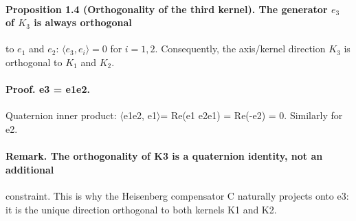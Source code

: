 \paragraph*{Proposition 1.4 (Orthogonality of the third kernel). The generator $e_3$ of $K_3$ is always orthogonal}
to $e_1$ and $e_2$: $\langle e_3, e_i\rangle = 0$ for $i=1,2$. Consequently, the axis/kernel direction $K_3$ is orthogonal to $K_1$ and $K_2$.
\paragraph*{Proof. e3 = e1e2.}
Quaternion inner product: $\langle$e1e2, e1$\rangle$= Re(e1 e2e1) = Re(-e2) = 0. Similarly for e2.
\paragraph*{Remark. The orthogonality of K3 is a quaternion identity, not an additional}
constraint. This is why the Heisenberg compensator C naturally projects onto e3: it is the unique direction orthogonal to both kernels K1 and K2.


